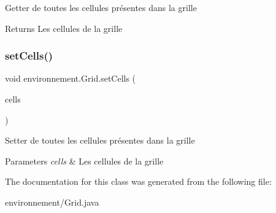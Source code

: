 Getter de toutes les cellules présentes dans la grille \begin{DoxyReturn}{Returns}
Les cellules de la grille 
\end{DoxyReturn}
\hypertarget{classenvironnement_1_1_grid_a1ea7cb1aa53fa6c45291ad29349731b2}{}\label{classenvironnement_1_1_grid_a1ea7cb1aa53fa6c45291ad29349731b2} 
\subsubsection{\texorpdfstring{set\+Cells()}{setCells()}}
{\footnotesize\ttfamily void environnement.\+Grid.\+set\+Cells (\begin{DoxyParamCaption}\item[{Array\+List$<$ \hyperlink{classenvironnement_1_1_cell}{Cell} $>$}]{cells }\end{DoxyParamCaption})}

Setter de toutes les cellules présentes dans la grille 
\begin{DoxyParams}{Parameters}
{\em cells} & Les cellules de la grille \\
\hline
\end{DoxyParams}


The documentation for this class was generated from the following file\+:\begin{DoxyCompactItemize}
\item 
environnement/Grid.\+java\end{DoxyCompactItemize}
